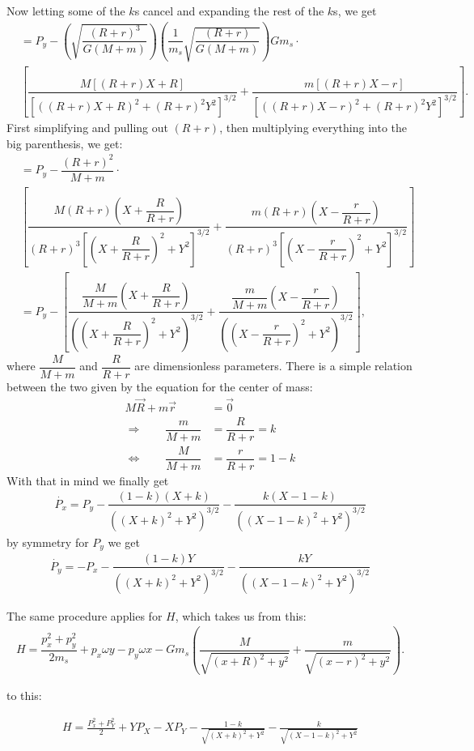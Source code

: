 Now letting some of the $k$s cancel and expanding the rest of the $k$s, we get
\begin{align}
\nonumber &= P_y - \left(\sqrt{\dfrac{(R+r)^3}{G(M+m)}}\right) \left(\dfrac{1}{m_s} \sqrt{\dfrac{(R+r)}{G(M+m)}}\right) G m_s \cdot \\
&\left[\dfrac{M[(R+r) X + R]}{[((R+r) X + R)^2 + (R+r)^2 Y^2]^{3/2}} + \dfrac{m[(R+r) X - r]}{[((R+r) X - r)^2 + (R+r)^2 Y^2]^{3/2}} \right].
\end{align}
First simplifying and pulling out $(R+r)$, then multiplying everything into the big parenthesis, we get:
\begin{align}
\nonumber &= P_y - \dfrac{(R+r)^2}{M+m} \cdot \\ 
&\left[\dfrac{M(R+r)\left(X + \dfrac{R}{R+r}\right)}{(R+r)^3\left[\left(X + \dfrac{R}{R+r}\right)^2 + Y^2\right]^{3/2}} + \dfrac{m (R+r)\left(X - \dfrac{r}{R+r}\right)}{(R+r)^3\left[\left(X - \dfrac{r}{R+r}\right)^2 + Y^2\right]^{3/2}} \right] \\[1cm]
&= P_y - \left[\dfrac{\dfrac{M}{M+m}\left(X + \dfrac{R}{R+r}\right)}{\left(\left(X + \dfrac{R}{R+r}\right)^2 + Y^2\right)^{3/2}} + \dfrac{\dfrac{m}{M+m} \left(X - \dfrac{r}{R+r}\right)}{\left(\left(X - \dfrac{r}{R+r}\right)^2 + Y^2\right)^{3/2}} \right] ,
\end{align}
where $\dfrac{M}{M+m}$ and $\dfrac{R}{R+r}$ are dimensionless parameters. There is a simple relation between the two given by the equation for the center of mass:
\begin{align}
M\vec{R} + m\vec{r} &= \vec{0} \\[0.5cm]
\Rightarrow \qquad \dfrac{m}{M+m} &= \dfrac{R}{R+r} = k \\[0.5cm]
\Leftrightarrow \qquad \dfrac{M}{M+m} &= \dfrac{r}{R+r} = 1-k  
\end{align}
With that in mind we finally get
\begin{align}
\dot{P_x} = P_y - \dfrac{(1-k)(X+k)}{((X+k)^2+Y^2)^{3/2}} - \dfrac{k(X-1-k)}{((X-1-k)^2+Y^2)^{3/2}}
\end{align}
by symmetry for $P_y$ we get
\begin{align}
\dot{P_y} = -P_x - \dfrac{(1-k)Y}{((X+k)^2+Y^2)^{3/2}} - \dfrac{k Y}{((X-1-k)^2+Y^2)^{3/2}}
\end{align}

The same procedure applies for $H$, which takes us from this:
\begin{align}
    H = \dfrac{p_x^2 + p_y^2}{2 m_s} + p_x\omega y - p_y\omega x - G m_s \left(\dfrac{M}{\sqrt{(x+R)^2+y^2}} + \dfrac{m}{\sqrt{(x-r)^2+y^2}}\right).
\end{align}

to this:

\begin{align}
    H = \frac{P_x^2 + P_Y^2}{2} + Y P_X - X P_Y - \frac{1 -k}{\sqrt{(X+k)^2 + Y^2 }} - \frac{k}{\sqrt{(X-1-k)^2 + Y^2}}
\end{align}
